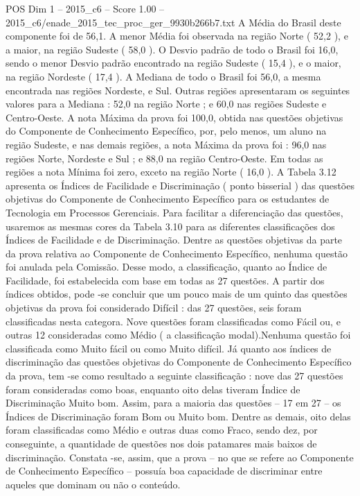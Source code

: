 \begin{textsample}{POS Dim 1 – 2015\_c6 – Score 1.00 – 2015\_c6/enade\_2015\_tec\_proc\_ger\_9930b266b7.txt}
A Média do Brasil deste componente foi de 56,1.
A menor Média foi observada na região Norte ( 52,2 ), e a maior, na região Sudeste ( 58,0 ).
O Desvio padrão de todo o Brasil foi 16,0, sendo o menor Desvio padrão encontrado na região Sudeste ( 15,4 ), e o maior, na região Nordeste ( 17,4 ).
A Mediana de todo o Brasil foi 56,0, a mesma encontrada nas regiões Nordeste, e Sul.
Outras regiões apresentaram os seguintes valores para a Mediana : 52,0 na região Norte ; e 60,0 nas regiões Sudeste e Centro-Oeste.
A nota Máxima da prova foi 100,0, obtida nas questões objetivas do Componente de Conhecimento Específico, por, pelo menos, um aluno na região Sudeste, e nas demais regiões, a nota Máxima da prova foi : 96,0 nas regiões Norte, Nordeste e Sul ; e 88,0 na região Centro-Oeste.
Em todas as regiões a nota Mínima foi zero, exceto na região Norte ( 16,0 ).
A Tabela 3.12 apresenta os Índices de Facilidade e Discriminação ( ponto bisserial ) das questões objetivas do Componente de Conhecimento Específico para os estudantes de Tecnologia em Processos Gerenciais.
Para facilitar a diferenciação das questões, usaremos as mesmas cores da Tabela 3.10 para as diferentes classificações dos Índices de Facilidade e de Discriminação.
Dentre as questões objetivas da parte da prova relativa ao Componente de Conhecimento Específico, nenhuma questão foi anulada pela Comissão.
Desse modo, a classificação, quanto ao Índice de Facilidade, foi estabelecida com base em todas as 27 questões.
A partir dos índices obtidos, pode -se concluir que um pouco mais de um quinto das questões objetivas da prova foi considerado Difícil : das 27 questões, seis foram classificadas nesta categora.
Nove questões foram classificadas como Fácil ou, e outras 12 consideradas como Médio ( a classificação modal).Nenhuma questão foi classificada como Muito fácil ou como Muito difícil.
Já quanto aos índices de discriminação das questões objetivas do Componente de Conhecimento Específico da prova, tem -se como resultado a seguinte classificação : nove das 27 questões foram consideradas como boas, enquanto oito delas tiveram Índice de Discriminação Muito bom.
Assim, para a maioria das questões – 17 em 27 – os Índices de Discriminação foram Bom ou Muito bom.
Dentre as demais, oito delas foram classificadas como Médio e outras duas como Fraco, sendo dez, por conseguinte, a quantidade de questões nos dois patamares mais baixos de discriminação.
Constata -se, assim, que a prova – no que se refere ao Componente de Conhecimento Específico – possuía boa capacidade de discriminar entre aqueles que dominam ou não o conteúdo.

\end{textsample}
